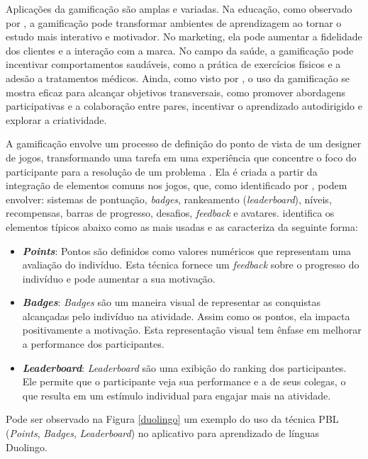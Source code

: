 \documentclass[
	12pt,
	openright,
	twoside,
	a4paper,
	english,
	brazil
	]{abntex2}
\begin{document}
Aplicações da gamificação são amplas e variadas. Na educação, como observado por , a gamificação pode transformar ambientes de aprendizagem ao tornar o estudo mais interativo e motivador. No marketing, ela pode aumentar a fidelidade dos clientes e a interação com a marca. No campo da saúde, a gamificação pode incentivar comportamentos saudáveis, como a prática de exercícios físicos e a adesão a tratamentos médicos. Ainda, como visto por , o uso da gamificação se mostra eficaz para alcançar objetivos transversais, como promover abordagens participativas e a colaboração entre pares, incentivar o aprendizado autodirigido e explorar a criatividade.

A gamificação envolve um processo de definição do ponto de vista de um designer de jogos, transformando uma tarefa em uma experiência que concentre o foco do participante para a resolução de um problema \cite{Fardo_2013}. Ela é criada a partir da integração de elementos comuns nos jogos, que, como identificado por , podem envolver: sistemas de pontuação, \textit{badges}, rankeamento (\textit{leaderboard}), níveis, recompensas, barras de progresso, desafios, \textit{feedback} e avatares.  identifica os elementos típicos abaixo como as mais usadas e as caracteriza da seguinte forma:
\begin{itemize}
  \item \textbf{\textit{Points}}: Pontos são definidos como valores numéricos que representam uma avaliação do indivíduo. Esta técnica fornece um \textit{feedback} sobre o progresso do indivíduo e pode aumentar a sua motivação.

  \item \textbf{\textit{Badges}}: \textit{Badges} são um maneira visual de representar as conquistas alcançadas pelo indivíduo na atividade. Assim como os pontos, ela impacta positivamente a motivação. Esta representação visual tem ênfase em melhorar a performance dos participantes.

  \item \textbf{\textit{Leaderboard}}: \textit{Leaderboard} são uma exibição do ranking dos participantes. Ele permite que o participante veja sua performance e a de seus colegas, o que resulta em um estímulo individual para engajar mais na atividade.
\end{itemize}

Pode ser observado na Figura \ref{duolingo} um exemplo do uso da técnica PBL (\textit{Points}, \textit{Badges}, \textit{Leaderboard}) no aplicativo para aprendizado de línguas Duolingo.
\end{document}
